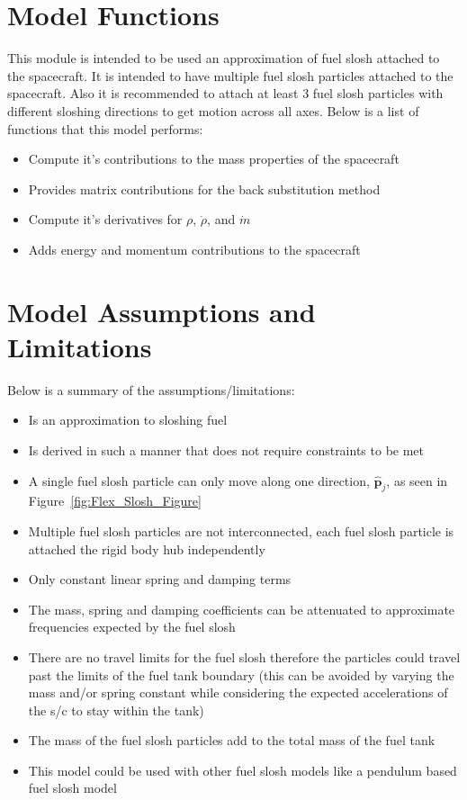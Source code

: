 \section{Model Functions}

This module is intended to be used an approximation of fuel slosh attached to the spacecraft. It is intended to have multiple fuel slosh particles attached to the spacecraft. Also it is recommended to attach at least 3 fuel slosh particles with different sloshing directions to get motion across all axes. Below is a list of functions that this model performs:

\begin{itemize}
	\item Compute it's contributions to the mass properties of the spacecraft
	\item Provides matrix contributions for the back substitution method
	\item Compute it's derivatives for $\rho$, $\dot{\rho}$, and $\dot{m}$
	\item Adds energy and momentum contributions to the spacecraft
\end{itemize}

\section{Model Assumptions and Limitations}
Below is a summary of the assumptions/limitations:

\begin{itemize}
	\item Is an approximation to sloshing fuel
	\item Is derived in such a manner that does not require constraints to be met
	\item A single fuel slosh particle can only move along one direction, $\hat{\bm p}_j$, as seen in Figure~\ref{fig:Flex_Slosh_Figure}
	\item Multiple fuel slosh particles are not interconnected, each fuel slosh particle is attached the rigid body hub independently
	\item Only constant linear spring and damping terms
	\item The mass, spring and damping coefficients can be attenuated to approximate frequencies expected by the fuel slosh
	\item There are no travel limits for the fuel slosh therefore the particles could travel past the limits of the fuel tank boundary (this can be avoided by varying the mass and/or spring constant while considering the expected accelerations of the s/c to stay within the tank)
	\item The mass of the fuel slosh particles add to the total mass of the fuel tank
	\item This model could be used with other fuel slosh models like a pendulum based fuel slosh model
\end{itemize}
